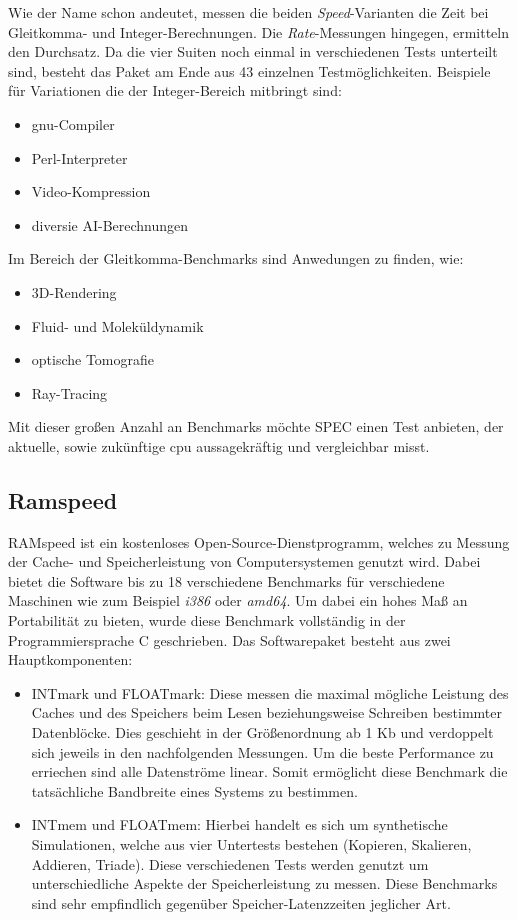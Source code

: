 Wie der Name schon andeutet, messen die beiden \emph{Speed}-Varianten die Zeit bei Gleitkomma- und Integer-Berechnungen. Die \emph{Rate}-Messungen hingegen, ermitteln den Durchsatz. Da die vier Suiten
noch einmal in verschiedenen Tests unterteilt sind, besteht das Paket am Ende aus 43 einzelnen Testmöglichkeiten. Beispiele für Variationen die der Integer-Bereich mitbringt sind: \\
\begin{itemize}
\item \ac{gnu}-Compiler
\item Perl-Interpreter
\item Video-Kompression
\item diversie AI-Berechnungen
\end{itemize}


Im Bereich der Gleitkomma-Benchmarks sind Anwedungen zu finden, wie: \\
\begin{itemize}
\item 3D-Rendering
\item Fluid- und Moleküldynamik
\item optische Tomografie
\item Ray-Tracing
\end{itemize}
Mit dieser großen Anzahl an Benchmarks möchte SPEC einen Test anbieten, der aktuelle, sowie zukünftige \ac{cpu} aussagekräftig und vergleichbar misst.~\cite{spec}

\subsection{Ramspeed}\label{kap:ramspeed}
RAMspeed ist ein kostenloses Open-Source-Dienstprogramm, welches zu Messung der Cache- und Speicherleistung von Computersystemen genutzt wird. Dabei bietet die Software bis zu 18 verschiedene
Benchmarks für verschiedene Maschinen wie zum Beispiel \emph{i386} oder \emph{amd64}. Um dabei ein hohes Maß an Portabilität zu bieten, wurde diese Benchmark vollständig in der Programmiersprache
C geschrieben. Das Softwarepaket besteht aus zwei Hauptkomponenten:~\cite{ramspeed}\\
\begin{itemize}
  \item INTmark und FLOATmark: Diese messen die maximal mögliche Leistung des Caches und des Speichers beim Lesen beziehungsweise Schreiben bestimmter Datenblöcke. Dies geschieht in der Größenordnung ab 1 Kb und
                               verdoppelt sich jeweils in den nachfolgenden Messungen. Um die beste Performance zu erriechen sind alle Datenströme linear. Somit ermöglicht diese Benchmark die
                               tatsächliche Bandbreite eines Systems zu bestimmen.
  \item INTmem und FLOATmem: Hierbei handelt es sich um synthetische Simulationen, welche aus vier Untertests bestehen (Kopieren, Skalieren, Addieren, Triade). Diese verschiedenen Tests werden
                             genutzt um unterschiedliche Aspekte der Speicherleistung zu messen. Diese Benchmarks sind sehr empfindlich gegenüber Speicher-Latenzzeiten jeglicher Art.
\end{itemize}

